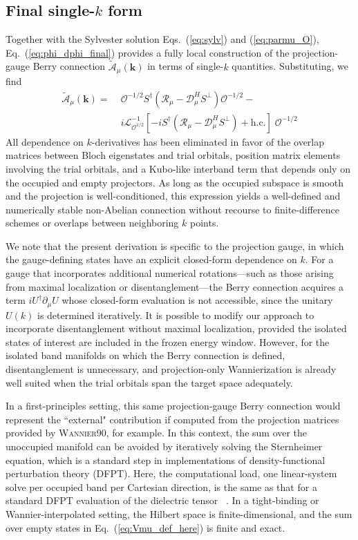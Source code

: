 \documentclass[galley,aps,pra,10pt,amsmath,amssymb,
    superscriptaddress,nofootinbib,longbibliography]{revtex4-2}
\newcounter{comm}
\newcommand{\eq}[1]{Eq.~(\ref{eq:#1})}
\newcommand{\eqs}[2]{Eqs.~(\ref{eq:#1}) and (\ref{eq:#2})}
\begin{document}
\subsection{Final single-$k$ form}
Together with the Sylvester solution \eqs{sylv}{parmu_O}, \eq{phi_dphi_final} provides
a fully local construction of the projection-gauge Berry connection $\tilde{\mathcal{A}}_\mu(\mathbf{k})$ in terms of single-$k$ quantities. Substituting, we find
\begin{align}
\label{eq:tildeA_final}
    \tilde{\mathcal{A}}_\mu(\mathbf{k}) = \; &\mathcal{O}^{-1/2} S^\dagger \left( \mathcal{R}_\mu  -  \mathcal{D}^H_\mu S^\perp\right) \mathcal{O}^{-1/2} - \\ \nonumber &i \mathcal{L}^{-1}_{\mathcal{O}^{1/2}}[-i S^\dagger\left( \mathcal{R}_\mu  - \mathcal{D}^H_\mu S^\perp\right) + \mathrm{h.c.}]\;\mathcal{O}^{-1/2}
\end{align}
All dependence on $k$-derivatives has been eliminated in favor of the overlap matrices between Bloch eigenstates and trial orbitals, position matrix elements involving the trial orbitals, and a Kubo-like interband term that depends only on the occupied and empty projectors. As long as the occupied subspace is smooth and the projection is well-conditioned, this expression yields a well-defined and numerically stable non-Abelian connection without recourse to finite-difference schemes or overlaps between neighboring $k$ points.

We note that the present derivation is specific to the projection gauge, in which the gauge-defining states have an explicit closed-form dependence on $k$. For a gauge that incorporates additional numerical rotations---such as those arising from maximal localization or disentanglement---the Berry connection acquires a term $iU^\dagger \partial_\mu U$ whose closed-form evaluation is not accessible, since the unitary $U(k)$ is determined iteratively. It is possible to modify our approach to incorporate disentanglement without maximal localization, provided the isolated states of interest are included in the frozen energy window. However, for the isolated band manifolds on which the Berry connection is defined, disentanglement is unnecessary, and projection-only Wannierization is already well suited when the trial orbitals span the target space adequately.

In a first-principles setting, this same projection-gauge Berry connection would represent the ``external" contribution if computed from the projection matrices provided by \textsc{Wannier90}, for example. In this context, the sum over the unoccupied manifold can be avoided by iteratively solving the Sternheimer equation, which is a standard step in implementations of density-functional perturbation theory (DFPT). Here, the computational load, one linear-system solve per occupied band per Cartesian direction, is the same as that for a standard DFPT evaluation of the dielectric tensor ~\cite{Baroni1987, Gonze1995, Gonze1997, baroni2001}. In a tight-binding or Wannier-interpolated setting, the Hilbert space is finite-dimensional, and the sum over empty states in Eq.~(\ref{eq:Vmu_def_here}) is finite and exact.
\end{document}
